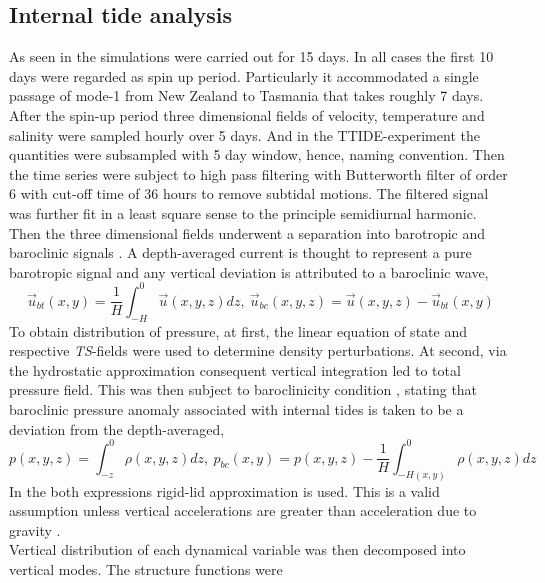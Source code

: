 \documentclass[12pt]{article}
\begin{document}
\subsection{Internal tide analysis}
\label{C3.sec:anlsys}
As seen in  the simulations were carried out for 15 days. In all 
cases the first 10 days were regarded as spin up period. Particularly it accommodated a single 
passage of mode-1 from New Zealand 
to Tasmania that takes roughly 7 days. After the spin-up period three 
dimensional fields of velocity, temperature and salinity were sampled hourly over 5 days. And in 
the TTIDE-experiment the quantities were subsampled with 5 day window, hence, naming convention. 
Then the time series were subject to high pass filtering with Butterworth filter 
of 
order $6$ with cut-off time of $36$ 
hours to remove subtidal motions. The filtered signal was further fit in a least square sense to 
the 
principle semidiurnal harmonic. Then the three dimensional fields 
underwent a separation into barotropic and baroclinic signals \citep{cummins1997simulation, 
kunze2002internal, carter2008energetics}. A depth-averaged current is thought to represent a pure 
barotropic signal and any vertical deviation is attributed to a baroclinic wave,
\begin{equation}
\label{ch2:bt_bc_vel}
\vec{u}_{bt}(x,y) = \frac{1}{H} \int_{-H}^{0} \vec{u}(x,y,z)  dz,~\vec{u}_{bc}(x,y,z) =  
\vec{u}(x,y,z) - \vec{u}_{bt}(x,y)
\end{equation}
To obtain distribution of pressure, at first, the linear equation of state and respective 
\textit{TS}-fields were used to determine density perturbations. At second, via the hydrostatic 
approximation consequent vertical integration led to total pressure field. This 
was then subject to baroclinicity condition \citep{kunze2002internal, kelly2010topo}, stating that 
baroclinic pressure 
anomaly associated 
with internal tides is taken to be a deviation from the depth-averaged,
\begin{equation}
\label{ch2:bt_bc_pres}
p(x,y,z) = \int_{-z}^{0} \rho(x,y,z) dz,~p_{bc}(x,y) = p(x,y,z) - \frac{1}{H} \int_{-H(x,y)}^{0} 
\rho(x,y,z) dz
\end{equation}
In the both expressions rigid-lid approximation is used. This is a valid assumption unless 
vertical accelerations are greater than acceleration due to gravity \citep{kelly2010topo}.\\
Vertical distribution of each dynamical variable was then decomposed into vertical modes. The 
structure functions were 
\end{document}
